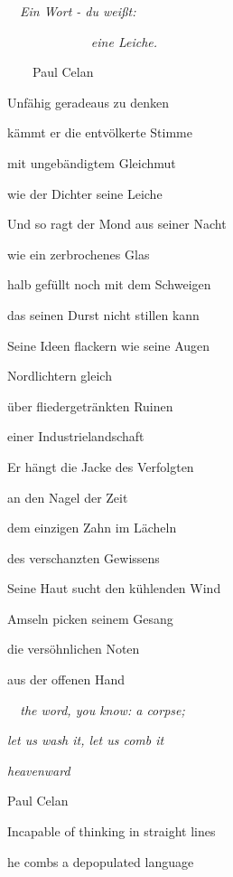 \documentclass[a4paper]{article}
\begin{document}
\bigskip

\ \  \textit{Ein Wort - du weißt:}

\textit{\ \ \ \ \ \ \ \ \ \ \ \ }\ \textit{eine Leiche.}

\ \ \ \  Paul Celan


\bigskip

Unfähig geradeaus zu denken

kämmt er die entvölkerte Stimme

mit ungebändigtem Gleichmut 

wie der Dichter seine Leiche


\bigskip

Und so ragt der Mond aus seiner Nacht

wie ein zerbrochenes Glas

halb gefüllt noch mit dem Schweigen

das seinen Durst nicht stillen kann


\bigskip

Seine Ideen flackern wie seine Augen

Nordlichtern gleich

über fliedergetränkten Ruinen

einer Industrielandschaft


\bigskip

Er hängt die Jacke des Verfolgten

an den Nagel der Zeit

dem einzigen Zahn im Lächeln

des verschanzten Gewissens


\bigskip

Seine Haut sucht den kühlenden Wind

Amseln picken seinem Gesang

die versöhnlichen Noten

aus der offenen Hand


\bigskip



\bigskip

{\itshape
\ \ the word, you know: a corpse;}

{\itshape
let us wash it, let us comb it}

\textit{heavenward} 

Paul Celan


\bigskip

Incapable of thinking in straight lines

he combs a depopulated language 
\end{document}
